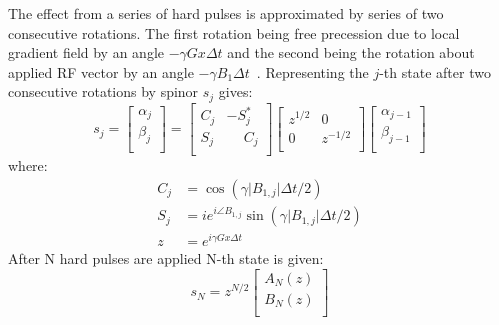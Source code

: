 The effect from a series of hard pulses is approximated by series of two consecutive rotations. 
The first rotation being free precession due to local gradient field by an angle $-\gamma G x \Delta t$ and the second being the rotation about applied RF vector by an angle $-\gamma B_1 \Delta t$~\cite{Pauly:1991ge}. 
Representing the $j$-th state after two consecutive rotations by spinor $s_j$ gives:
\begin{equation}\label{eq: SLR j-th rotation}
s_j =
\begin{bmatrix}
    \alpha_j\\
    \beta_j\\
\end{bmatrix} = 
	\begin{bmatrix}
    C_j & -S_j^*\\
    S_j & \phantom{-}C_j\\
	\end{bmatrix}
	\begin{bmatrix}
    z^{1/2} & 0\\
    0 & z^{-1/2}\\
	\end{bmatrix}
	\begin{bmatrix}
    \alpha_{j-1}\\
    \beta_{j-1}\\
	\end{bmatrix}
\end{equation}
where:
\begin{equation}\label{eq: SLR two rotations}
\begin{aligned}
C_j &= \cos(\gamma \vert B_{1,j} \vert \Delta t /2) \\
S_j &= i e^{i \angle B_{1,j} }\sin(\gamma \vert B_{1,j} \vert \Delta t /2) \\
z &= e^{i \gamma G x \Delta t}
\end{aligned}
\end{equation}
After N hard pulses are applied N-th state is given:
\begin{equation}\label{eq: SLR rotation N}
s_N = z^{N/2}
\begin{bmatrix}
    A_N(z)\\
    B_N(z)\\
\end{bmatrix}
\end{equation}
